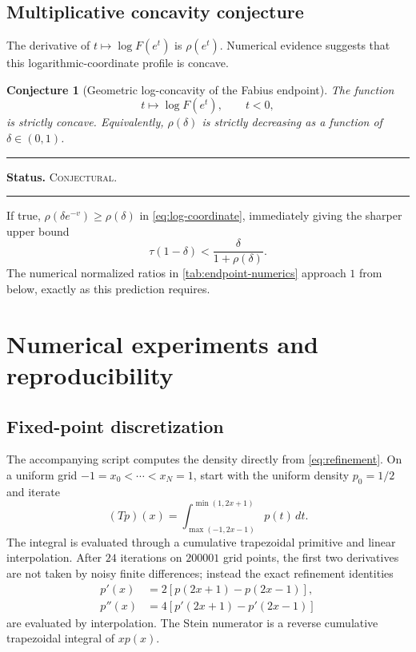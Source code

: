 \documentclass[11pt,oneside]{article}
\newtheorem{conjecture}[theorem]{Conjecture}
\theoremstyle{definition}
\theoremstyle{remark}
\newenvironment{boxedremark}{%
  \par\smallskip\noindent\begin{center}\begin{minipage}{0.94\textwidth}%
  \color{black}\hrule\vspace{0.6em}\small
}{%
  \vspace{0.6em}\hrule\end{minipage}\end{center}\smallskip
}
\newcommand{\Conjectural}{\textsc{Conjectural}}
\newcommand{\Status}[1]{%
  \begin{boxedremark}\textbf{Status.} #1.\end{boxedremark}}
\begin{document}
\subsection{Multiplicative concavity conjecture}
The derivative of $t\mapsto\log F(e^t)$ is $\rho(e^t)$.  Numerical evidence
suggests that this logarithmic-coordinate profile is concave.

\begin{conjecture}[Geometric log-concavity of the Fabius endpoint]
\label{conj:geometric-concavity}
The function
\[
 t\longmapsto\log F(e^t),\qquad t<0,
\]
is strictly concave.  Equivalently, $\rho(\delta)$ is strictly decreasing as a
function of $\delta\in(0,1)$.
\end{conjecture}
\Status{\Conjectural}

If true, $\rho(\delta e^{-v})\ge\rho(\delta)$ in
\eqref{eq:log-coordinate}, immediately giving the sharper upper bound
\begin{equation}\label{eq:sharp-conjectural-upper}
 \tau(1-\delta)<\frac{\delta}{1+\rho(\delta)}.
\end{equation}
The numerical normalized ratios in \cref{tab:endpoint-numerics} approach $1$
from below, exactly as this prediction requires.

\section{Numerical experiments and reproducibility}

\subsection{Fixed-point discretization}
The accompanying script  computes the
density directly from \eqref{eq:refinement}.  On a uniform grid
$-1=x_0<\cdots<x_N=1$, start with the uniform density $p_0=1/2$ and iterate
\begin{equation}\label{eq:numerical-T}
 (Tp)(x)=\int_{\max(-1,2x-1)}^{\min(1,2x+1)}p(t)\,dt.
\end{equation}
The integral is evaluated through a cumulative trapezoidal primitive and linear
interpolation.  After $24$ iterations on $200001$ grid points, the first two
derivatives are not taken by noisy finite differences; instead the exact
refinement identities
\begin{align}
 p'(x)&=2[p(2x+1)-p(2x-1)],\\
 p''(x)&=4[p'(2x+1)-p'(2x-1)]
\end{align}
are evaluated by interpolation.  The Stein numerator is a reverse cumulative
trapezoidal integral of $xp(x)$.
\end{document}
